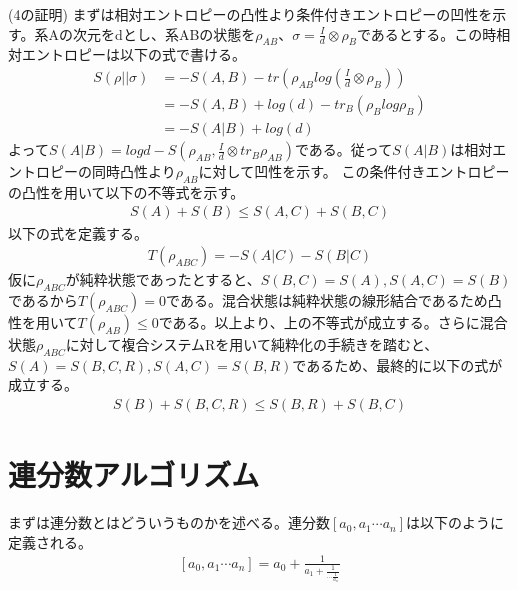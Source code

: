\documentclass[a4paper,10.5pt]{article}
\numberwithin{equation}{section}
\begin{document}
(4の証明)
まずは相対エントロピーの凸性より条件付きエントロピーの凹性を示す。系Aの次元をdとし、系ABの状態を$\rho_{AB}$、$\sigma=\frac{I}{d}\otimes \rho_{B}$であるとする。この時相対エントロピーは以下の式で書ける。
\begin{equation}\begin{split}
     S(\rho||\sigma)&=-S(A,B)-tr(\rho_{AB}log(\frac{I}{d}\otimes \rho_{B}))\\
     &=-S(A,B)+log(d)-tr_{B}(\rho_{B}log\rho_{B})\\
     &=-S(A|B)+log(d)
\end{split} \end{equation}
よって$S(A|B)=logd-S(\rho_{AB},\frac{I}{d}\otimes tr_{B}\rho_{AB})$である。従って$S(A|B)$は相対エントロピーの同時凸性より$\rho_{AB}$に対して凹性を示す。
この条件付きエントロピーの凸性を用いて以下の不等式を示す。
\begin{equation}\begin{split}
    S(A)+S(B) \leq S(A,C)+S(B,C)
\end{split} \end{equation}
以下の式を定義する。
\begin{equation}\begin{split}
    T(\rho_{ABC})=-S(A|C)-S(B|C)
\end{split} \end{equation}
仮に$\rho_{ABC}$が純粋状態であったとすると、$S(B,C)=S(A),S(A,C)=S(B)$であるから$T(\rho_{ABC})=0$である。混合状態は純粋状態の線形結合であるため凸性を用いて$T(\rho_{AB})\leq 0$である。以上より、上の不等式が成立する。さらに混合状態$\rho_{ABC}$に対して複合システムRを用いて純粋化の手続きを踏むと、$S(A)=S(B,C,R),S(A,C)=S(B,R)$であるため、最終的に以下の式が成立する。
\begin{equation}\begin{split}
    S(B)+S(B,C,R)\leq S(B,R)+S(B,C)
\end{split} \end{equation}
 
 \section{連分数アルゴリズム}
まずは連分数とはどういうものかを述べる。連分数$[a_{0},a_{1} \cdots a_{n}]$は以下のように定義される。
 \begin{equation}\begin{split}
     [a_{0},a_{1} \cdots a_{n}] = a_{0} + \frac{1}{{ a_{1} + \frac{1}{\cdots\frac{1}{a_{n}}}}}
 \end{split} \end{equation}
\end{document}
